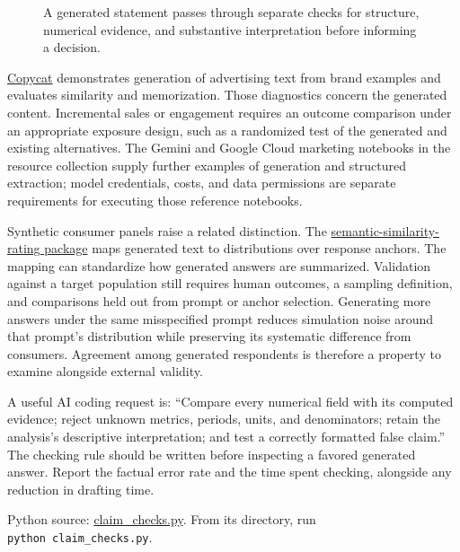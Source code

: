 \begin{figure}[htbp]
\centering

\caption{A generated statement passes through separate checks for structure, numerical evidence, and substantive interpretation before informing a decision.}\label{fig:M08_evidence_checks}
\end{figure}

\href{https://github.com/google-marketing-solutions/copycat}{Copycat}
demonstrates generation of advertising text from brand examples and
evaluates similarity and memorization. Those diagnostics concern the
generated content. Incremental sales or engagement requires an outcome
comparison under an appropriate exposure design, such as a randomized
test of the generated and existing alternatives. The Gemini and Google
Cloud marketing notebooks in the resource collection supply further
examples of generation and structured extraction; model credentials,
costs, and data permissions are separate requirements for executing
those reference notebooks.

Synthetic consumer panels raise a related distinction. The
\href{https://github.com/pymc-labs/semantic-similarity-rating}{semantic-similarity-rating
package} maps generated text to distributions over response anchors. The
mapping can standardize how generated answers are summarized. Validation
against a target population still requires human outcomes, a sampling
definition, and comparisons held out from prompt or anchor selection.
Generating more answers under the same misspecified prompt reduces
simulation noise around that prompt's distribution while preserving its
systematic difference from consumers. Agreement among generated
respondents is therefore a property to examine alongside external
validity.

A useful AI coding request is: ``Compare every numerical field with its
computed evidence; reject unknown metrics, periods, units, and
denominators; retain the analysis's descriptive interpretation; and test
a correctly formatted false claim.'' The checking rule should be written
before inspecting a favored generated answer. Report the factual error
rate and the time spent checking, alongside any reduction in drafting
time.

\FloatBarrier
{}
Python source:
\href{../03_Data_and_Code/mHealth/recurring_examples/claim_checks.py}{claim\_checks.py}.
From its directory, run \texttt{python\ claim\_checks.py}.

